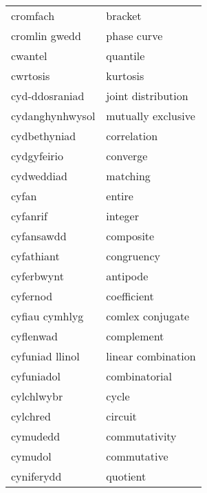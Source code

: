 \begin{supertabular}{p{0.22\textwidth}p{0.22\textwidth}}
                        cromfach &                           bracket \\
                   cromlin gwedd &                       phase curve \\
                         cwantel &                          quantile \\
                        cwrtosis &                          kurtosis \\
                  cyd-ddosraniad &                joint distribution \\
                 cydanghynhwysol &                mutually exclusive \\
                    cydbethyniad &                       correlation \\
                     cydgyfeirio &                          converge \\
                      cydweddiad &                          matching \\
                           cyfan &                            entire \\
                        cyfanrif &                           integer \\
                      cyfansawdd &                         composite \\
                      cyfathiant &                        congruency \\
                      cyferbwynt &                          antipode \\
                        cyfernod &                       coefficient \\
                  cyfiau cymhlyg &                  comlex conjugate \\
                       cyflenwad &                        complement \\
                 cyfuniad llinol &                linear combination \\
                      cyfuniadol &                     combinatorial \\
                      cylchlwybr &                             cycle \\
                        cylchred &                           circuit \\
                        cymudedd &                     commutativity \\
                         cymudol &                       commutative \\
                      cyniferydd &                          quotient \\

\end{supertabular}
